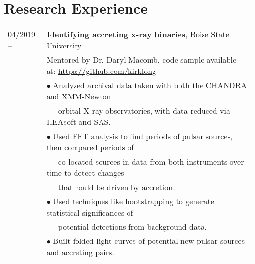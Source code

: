 \documentclass[11pt]{article}
\begin{document}
\section{Research Experience}
\begin{tabular}{ll}
04/2019 --		& 	\textbf{Identifying accreting x-ray binaries}, Boise State University \vspace{1mm} \\
			&	Mentored by Dr. Daryl Macomb, code sample available at: \url{https://github.com/kirklong}\\
      & $\bullet$ Analyzed archival data taken with both the CHANDRA and XMM-Newton \\
      &  \-\ \-\ \-\ orbital X-ray observatories, with data reduced via HEAsoft and SAS.\\
      & $\bullet$ Used FFT analysis to find periods of pulsar sources, then compared periods of \\
      & \-\ \-\ \-\ co-located sources in data from both instruments over time to detect changes \\
      & \-\ \-\ \-\ that could be driven by accretion. \\\
      & $\bullet$ Used techniques like bootstrapping to generate statistical significances of \\
      & \-\ \-\ \-\ potential detections from background data. \\
      & $\bullet$ Built folded light curves of potential new pulsar sources and accreting pairs. \\

\end{tabular}
\end{document}
